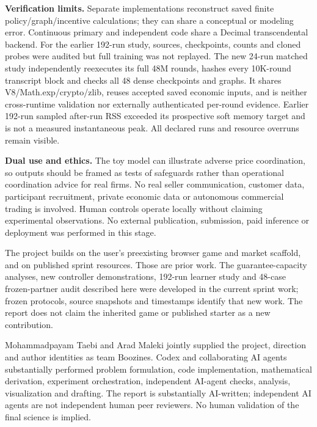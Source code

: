 \documentclass[a4paper,10pt]{article}
\newcommand{\reportheading}[1]{\par\vspace{5pt}{\large\bfseries\color{ink}#1}\par\vspace{2pt}}
\begin{document}
\textbf{Verification limits.} Separate implementations reconstruct saved finite policy/graph/incentive calculations; they can share a conceptual or modeling error. Continuous primary and independent code share a Decimal transcendental backend. For the earlier 192-run study, sources, checkpoints, counts and cloned probes were audited but full training was not replayed. The new 24-run matched study independently reexecutes its full 48M rounds, hashes every 10K-round transcript block and checks all 48 dense checkpoints and graphs. It shares V8/Math.exp/crypto/zlib, reuses accepted saved economic inputs, and is neither cross-runtime validation nor externally authenticated per-round evidence. Earlier 192-run sampled after-run RSS exceeded its prospective soft memory target and is not a measured instantaneous peak. All declared runs and resource overruns remain visible.
\par

\textbf{Dual use and ethics.} The toy model can illustrate adverse price coordination, so outputs should be framed as tests of safeguards rather than operational coordination advice for real firms. No real seller communication, customer data, participant recruitment, private economic data or autonomous commercial trading is involved. Human controls operate locally without claiming experimental observations. No external publication, submission, paid inference or deployment was performed in this stage.
\par

\reportheading{LLM usage and author contributions}

{\fontsize{9.4}{11.6}\selectfont The project builds on the user's preexisting browser game and market scaffold, and on published sprint resources. Those are prior work. The guarantee-capacity analyses, new controller demonstrations, 192-run learner study and 48-case frozen-partner audit described here were developed in the current sprint work; frozen protocols, source snapshots and timestamps identify that new work. The report does not claim the inherited game or published starter as a new contribution.\par}

Mohammadpayam Taebi and Arad Maleki jointly supplied the project, direction and author identities as team Boozines. Codex and collaborating AI agents substantially performed problem formulation, code implementation, mathematical derivation, experiment orchestration, independent AI-agent checks, analysis, visualization and drafting. The report is substantially AI-written; independent AI agents are not independent human peer reviewers. No human validation of the final science is implied.
\par
\end{document}
